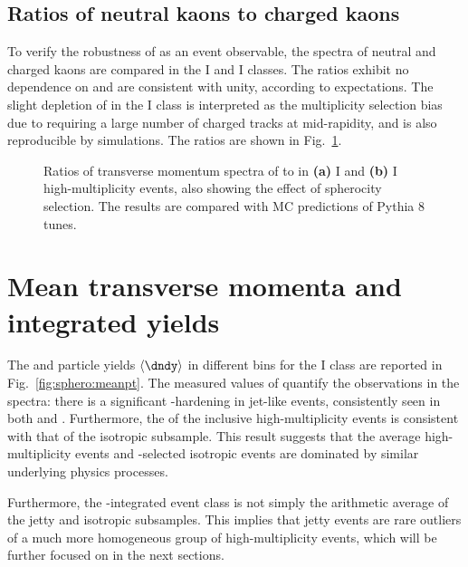 \subsection{Ratios of neutral kaons to charged kaons}

To verify the robustness of \SOPT as an event observable, the \pt spectra of neutral and charged kaons are compared in the \NSPD I and \VOM I classes. The ratios exhibit no dependence on \SOPT and are consistent with unity, according to expectations. The slight depletion of \KOs in the \NSPD I class is interpreted as the multiplicity selection bias due to requiring a large number of charged tracks at mid-rapidity, and is also reproducible by simulations. The ratios are shown in Fig.~\ref{fig:sphero:ktok}.

\begin{figure}[H]%
\centering%
\hspace{1em}
\caption{Ratios of transverse momentum spectra of \KOs to \kpm in \textbf{(a)} \NSPD I and \textbf{(b)} \VOM I high-multiplicity events, also showing the effect of spherocity selection. The results are compared with MC predictions of Pythia 8 tunes.}
\label{fig:sphero:ktok}
\end{figure}

\section{Mean transverse momenta and integrated yields}

The \meanpt and particle yields $\langle \dndy \rangle$ in different \SOPT bins for the \NSPD I class are reported in Fig.~\ref{fig:sphero:meanpt}. The measured values of \meanpt quantify the observations in the spectra: there is a significant \pt-hardening in jet-like events, consistently seen in both \KOs and \LA. Furthermore, the \meanpt of the inclusive high-multiplicity events is consistent with that of the isotropic subsample. This result suggests that the average high-multiplicity events and \SOPT-selected isotropic events are dominated by similar underlying physics processes.

Furthermore, the \SOPT-integrated event class is not simply the arithmetic average of the jetty and isotropic subsamples. This implies that jetty events are rare outliers of a much more homogeneous group of high-multiplicity events, which will be further focused on in the next sections.

